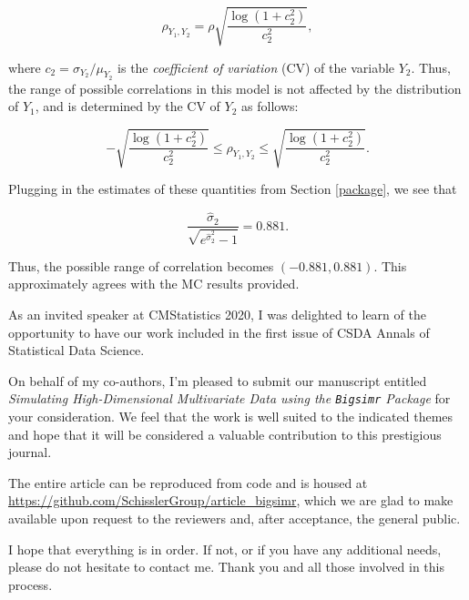 \documentclass[
]{jss}
\begin{document}
\begin{equation}
\rho_{Y_1, Y_2} = \rho \sqrt{\frac{\log(1+c_2^2)}{c_2^2}},
\label{eq:kram9}
\end{equation}

where \(c_2=\sigma_{Y_2}/\mu_{Y_2}\) is the \emph{coefficient of variation} (CV) of the variable \(Y_2\). Thus, the range of possible correlations in this model is not affected by the distribution of \(Y_1\), and is determined by the CV of \(Y_2\) as follows:

\begin{equation}
- \sqrt{\frac{\log(1+c_2^2)}{c_2^2}} \leq \rho_{Y_1, Y_2} \leq \sqrt{\frac{\log(1+c_2^2)}{c_2^2}}. 
\label{eq:kram10}
\end{equation}

Plugging in the estimates of these quantities from Section \ref{package}, we see that

\begin{equation}
\frac{\hat{\sigma}_2}{\sqrt{e^{\hat{\sigma}_2^2} -1}} = 0.881.
\label{eq:kram11}
\end{equation}

Thus, the possible range of correlation becomes \((-0.881, 0.881)\). This approximately agrees with the MC results provided.

As an invited speaker at CMStatistics 2020, I was delighted to learn of the opportunity to have our work included in the first issue of CSDA Annals of Statistical Data Science.

On behalf of my co-authors, I'm pleased to submit our manuscript entitled \emph{Simulating High-Dimensional Multivariate Data using the \texttt{Bigsimr} Package} for your consideration.
We feel that the work is well suited to the indicated themes and hope that it will be considered a valuable contribution to this prestigious journal.

The entire article can be reproduced from code and is housed at \url{https://github.com/SchisslerGroup/article_bigsimr}, which we are glad to make available upon request to the reviewers and, after acceptance, the general public.

I hope that everything is in order. If not, or if you have any additional needs, please do not hesitate to contact me. Thank you and all those involved in this process.


\end{document}

